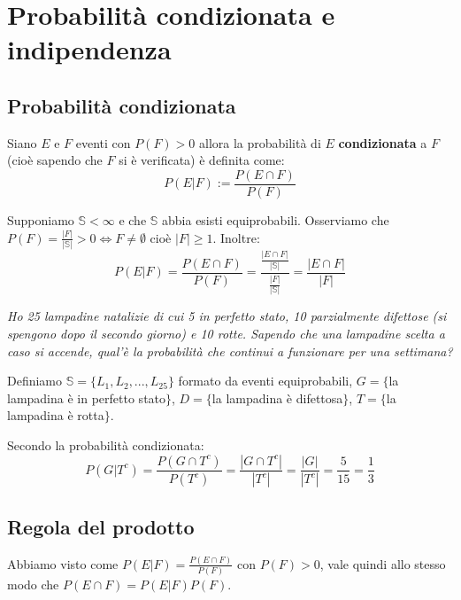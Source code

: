 \chapter{Probabilità condizionata e indipendenza}
\section{Probabilità condizionata}
\begin{redbar}
    Siano $E$ e $F$ eventi con $P(F)>0$ allora la probabilità di $E$ \textbf{condizionata} a $F$ (cioè sapendo che $F$ si è verificata) è definita come:
    \begin{equation*}
        P(E|F):=\frac{P(E\cap F)}{P(F)}
    \end{equation*}
\end{redbar}

Supponiamo $\mathbb{S}<\infty$ e che $\mathbb{S}$ abbia esisti equiprobabili. Osserviamo che $P(F)=\frac{|F|}{|\mathbb{S}|}>0\iff F\neq\emptyset$ cioè $|F|\geq1$. Inoltre:
\begin{equation*}
    P(E|F)=\frac{P(E\cap F)}{P(F)}=\frac{\frac{|E\cap F|}{|\mathbb{S}|}}{\frac{|F|}{|\mathbb{S}|}}=\frac{|E\cap F|}{|F|}
\end{equation*}

\begin{Example}{}{}
    \textit{Ho 25 lampadine natalizie di cui 5 in perfetto stato, 10 parzialmente difettose (si spengono dopo il secondo giorno) e 10 rotte. Sapendo che una lampadine scelta a caso si accende, qual'è la probabilità che continui a funzionare per una settimana?}

    Definiamo $\mathbb{S}=\{L_1,L_2,...,L_{25}\}$ formato da eventi equiprobabili, $G=\{$la lampadina è in perfetto stato$\}$, $D=\{$la lampadina è difettosa$\}$, $T=\{$la lampadina è rotta$\}$.

    Secondo la probabilità condizionata:
    \begin{equation*}
        P(G|T^c)=\frac{P(G\cap T^c)}{P(T^c)}=\frac{|G\cap T^c|}{|T^c|}=\frac{|G|}{|T^c|}=\frac{5}{15}=\frac{1}{3}
    \end{equation*}
\end{Example}

\section{Regola del prodotto}

Abbiamo visto come $P(E|F)=\frac{P(E\cap F)}{P(F)}$ con $P(F)>0$, vale quindi allo stesso modo che $P(E\cap F)=P(E|F)P(F)$. 

